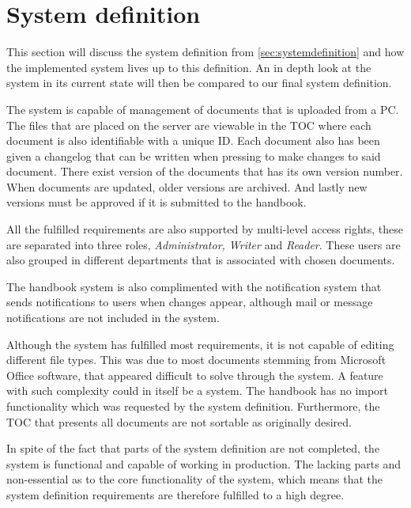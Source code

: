 \section{System definition}\label{sec:dissystemdef}

This section will discuss the system definition from \cref{sec:systemdefinition} and how the implemented system lives up to this definition.
An in depth look at the system in its current state will then be compared to our final system definition.

The system is capable of management of documents that is uploaded from a PC.
The files that are placed on the server are viewable in the TOC where each document is also identifiable with a unique ID.
Each document also has been given a changelog that can be written when pressing to make changes to said document.
There exist version of the documents that has its own version number.
When documents are updated, older versions are archived.
And lastly new versions must be approved if it is submitted to the handbook.

All the fulfilled requirements are also supported by multi-level access rights, these are separated into three roles, \textit{Administrator, Writer} and \textit{Reader}.
These users are also grouped in different departments that is associated with chosen documents.

The handbook system is also complimented with the notification system that sends notifications to users when changes appear, although mail or message notifications are not included in the system.

Although the system has fulfilled most requirements, it is not capable of editing different file types.
This was due to most documents stemming from Microsoft Office software, that appeared difficult to solve through the system.
A feature with such complexity could in itself be a system.
The handbook has no import functionality which was requested by the system definition.
Furthermore, the TOC that presents all documents are not sortable as originally desired.

In spite of the fact that parts of the system definition are not completed, the system is functional and capable of working in production.
The lacking parts and non-essential as to the core functionality of the system, which means that the system definition requirements are therefore fulfilled to a high degree.

